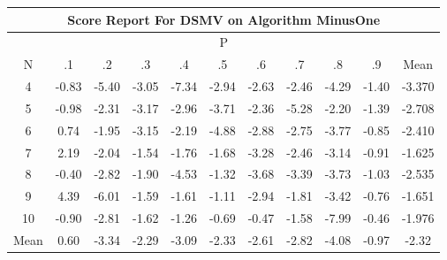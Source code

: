\documentclass[11pt,a4paper]{report}
\begin{document}
\begin{longtable}{ | c || c | c | c | c | c | c | c | c | c || c |}
\hline
\multicolumn{11}{|c|}{ Score Report For DSMV on Algorithm MinusOne} \\
\hline
\multicolumn{11}{|c|}{ P } \\
\hline
N & .1 & .2 & .3 & .4 & .5 & .6 & .7 & .8 & .9 & Mean\\
 \hline
 \hline
 \endhead
  4 &  \cellcolor[HTML]{FFE7E7} -0.83 &  \cellcolor[HTML]{FF7878} -5.40 &  \cellcolor[HTML]{FFAFAF} -3.05 &  \cellcolor[HTML]{FF4848} -7.34 &  \cellcolor[HTML]{FFB7B7} -2.94 &  \cellcolor[HTML]{FFBFBF} -2.63 &  \cellcolor[HTML]{FFBFBF} -2.46 &  \cellcolor[HTML]{FF8F8F} -4.29 &  \cellcolor[HTML]{FFDFDF} -1.40 & -3.370 \\
  5 &  \cellcolor[HTML]{FFE7E7} -0.98 &  \cellcolor[HTML]{FFC7C7} -2.31 &  \cellcolor[HTML]{FFAFAF} -3.17 &  \cellcolor[HTML]{FFB7B7} -2.96 &  \cellcolor[HTML]{FF9F9F} -3.71 &  \cellcolor[HTML]{FFC7C7} -2.36 &  \cellcolor[HTML]{FF7878} -5.28 &  \cellcolor[HTML]{FFC7C7} -2.20 &  \cellcolor[HTML]{FFDFDF} -1.39 & -2.708 \\
  6 &  \cellcolor[HTML]{EFEFFF} 0.74 &  \cellcolor[HTML]{FFCFCF} -1.95 &  \cellcolor[HTML]{FFAFAF} -3.15 &  \cellcolor[HTML]{FFC7C7} -2.19 &  \cellcolor[HTML]{FF8787} -4.88 &  \cellcolor[HTML]{FFB7B7} -2.88 &  \cellcolor[HTML]{FFB7B7} -2.75 &  \cellcolor[HTML]{FF9F9F} -3.77 &  \cellcolor[HTML]{FFE7E7} -0.85 & -2.410 \\
  7 &  \cellcolor[HTML]{C7C7FF} 2.19 &  \cellcolor[HTML]{FFCFCF} -2.04 &  \cellcolor[HTML]{FFD7D7} -1.54 &  \cellcolor[HTML]{FFCFCF} -1.76 &  \cellcolor[HTML]{FFD7D7} -1.68 &  \cellcolor[HTML]{FFAFAF} -3.28 &  \cellcolor[HTML]{FFBFBF} -2.46 &  \cellcolor[HTML]{FFAFAF} -3.14 &  \cellcolor[HTML]{FFE7E7} -0.91 & -1.625 \\
  8 &  \cellcolor[HTML]{FFF7F7} -0.40 &  \cellcolor[HTML]{FFB7B7} -2.82 &  \cellcolor[HTML]{FFCFCF} -1.90 &  \cellcolor[HTML]{FF8F8F} -4.53 &  \cellcolor[HTML]{FFDFDF} -1.32 &  \cellcolor[HTML]{FF9F9F} -3.68 &  \cellcolor[HTML]{FFA7A7} -3.39 &  \cellcolor[HTML]{FF9F9F} -3.73 &  \cellcolor[HTML]{FFE7E7} -1.03 & -2.535 \\
  9 &  \cellcolor[HTML]{8F8FFF} 4.39 &  \cellcolor[HTML]{FF6868} -6.01 &  \cellcolor[HTML]{FFD7D7} -1.59 &  \cellcolor[HTML]{FFD7D7} -1.61 &  \cellcolor[HTML]{FFE7E7} -1.11 &  \cellcolor[HTML]{FFB7B7} -2.94 &  \cellcolor[HTML]{FFCFCF} -1.81 &  \cellcolor[HTML]{FFA7A7} -3.42 &  \cellcolor[HTML]{FFEFEF} -0.76 & -1.651 \\
  10 &  \cellcolor[HTML]{FFE7E7} -0.90 &  \cellcolor[HTML]{FFB7B7} -2.81 &  \cellcolor[HTML]{FFD7D7} -1.62 &  \cellcolor[HTML]{FFDFDF} -1.26 &  \cellcolor[HTML]{FFEFEF} -0.69 &  \cellcolor[HTML]{FFF7F7} -0.47 &  \cellcolor[HTML]{FFD7D7} -1.58 &  \cellcolor[HTML]{FF3838} -7.99 &  \cellcolor[HTML]{FFF7F7} -0.46 & -1.976 \\
 \hline
 \hline
Mean &  \cellcolor[HTML]{EFEFFF} 0.60 &  \cellcolor[HTML]{FFA7A7} -3.34 &  \cellcolor[HTML]{FFC7C7} -2.29 &  \cellcolor[HTML]{FFAFAF} -3.09 &  \cellcolor[HTML]{FFC7C7} -2.33 &  \cellcolor[HTML]{FFBFBF} -2.61 &  \cellcolor[HTML]{FFB7B7} -2.82 &  \cellcolor[HTML]{FF9797} -4.08 &  \cellcolor[HTML]{FFE7E7} -0.97 &  \cellcolor[HTML]{FFC7C7} -2.32
\end{longtable}
\end{document}
